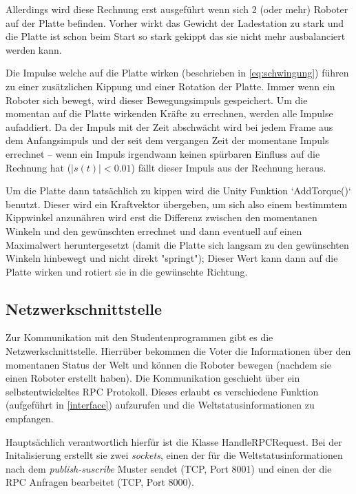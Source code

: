 Allerdings wird diese Rechnung erst ausgef{\"{u}}hrt wenn sich 2 (oder mehr) Roboter auf der Platte befinden. Vorher wirkt das Gewicht der Ladestation zu
stark und die Platte ist schon beim Start so stark gekippt das sie nicht mehr ausbalanciert werden kann.

Die Impulse welche auf die Platte wirken (beschrieben in \ref{eq:schwingung}) f{\"{u}}hren zu einer zus{\"{a}}tzlichen Kippung und einer Rotation der Platte.
Immer wenn ein Roboter sich bewegt, wird dieser Bewegungsimpuls gespeichert. Um die momentan auf die Platte wirkenden Kr{\"{a}}fte zu errechnen, werden alle
Impulse aufaddiert. Da der Impuls mit der Zeit abschw{\"{a}}cht wird bei jedem Frame aus dem Anfangsimpuls und der seit dem vergangen Zeit der momentane
Impuls errechnet -- wenn ein Impuls irgendwann keinen sp{\"{u}}rbaren Einfluss auf die Rechnung hat ($ |s(t)| < 0.01$) f{\"{a}}llt dieser Impuls aus der
Rechnung heraus.

Um die Platte dann tats{\"{a}}chlich zu kippen wird die Unity Funktion `AddTorque()` benutzt. Dieser wird ein Kraftvektor {\"{u}}bergeben, um sich also einem
bestimmtem Kippwinkel anzun{\"{a}}hren wird erst die Differenz zwischen den momentanen Winkeln und den gew{\"{u}}nschten errechnet und dann eventuell auf
einen Maximalwert heruntergesetzt (damit die Platte sich langsam zu den gew{\"{u}}nschten Winkeln hinbewegt und nicht direkt "springt"); Dieser Wert kann dann
auf die Platte wirken und rotiert sie in die gew{\"{u}}nschte Richtung.

\subsection{Netzwerkschnittstelle}
Zur Kommunikation mit den Studentenprogrammen gibt es die Netzwerkschnittstelle. Hierr{\"{u}}ber bekommen die Voter die Informationen {\"{u}}ber den momentanen
Status der Welt und k{\"{o}}nnen die Roboter bewegen (nachdem sie einen Roboter erstellt haben). Die Kommunikation geschieht {\"{u}}ber ein selbstentwickeltes
RPC Protokoll. Dieses erlaubt es verschiedene Funktion (aufgef{\"{u}}hrt in \ref{interface}) aufzurufen und die Weltstatusinformationen zu empfangen.

Haupts{\"{a}}chlich verantwortlich hierf{\"{u}}r ist die Klasse HandleRPCRequest. Bei der Initalisierung erstellt sie zwei \textit{sockets}, einen der f{\"{u}}r
die Weltstatusinformationen nach dem \textit{publish-suscribe} Muster sendet (TCP, Port 8001) und einen der die RPC Anfragen bearbeitet (TCP, Port 8000).

